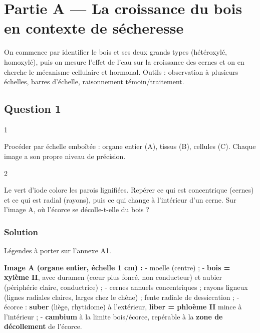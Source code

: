 \documentclass[11pt,a4paper]{article}
\begin{document}
\hypertarget{partie-a-la-croissance-du-bois-en-contexte-de-suxe9cheresse}{%
\section{Partie A --- La croissance du bois en contexte de sécheresse}\label{partie-a-la-croissance-du-bois-en-contexte-de-suxe9cheresse}}

On commence par identifier le bois et ses deux grands types (hétéroxylé, homoxylé), puis on mesure l'effet de l'eau sur la croissance des cernes et on en cherche le mécanisme cellulaire et hormonal. Outils : observation à plusieurs échelles, barres d'échelle, raisonnement témoin/traitement.

\hypertarget{question-1}{%
\subsection{Question 1}\label{question-1}}

\begin{indication}{1}

Procéder par échelle emboîtée : organe entier (A), tissus (B), cellules (C). Chaque image a son propre niveau de précision.

\end{indication}

\begin{indication}{2}

Le vert d'iode colore les parois lignifiées. Repérer ce qui est concentrique (cernes) et ce qui est radial (rayons), puis ce qui change à l'intérieur d'un cerne. Sur l'image A, où l'écorce se décolle-t-elle du bois ?

\end{indication}

\hypertarget{solution}{%
\subsubsection{Solution}\label{solution}}

Légendes à porter sur l'annexe A1.

\textbf{Image A (organe entier, échelle 1 cm) :}
- moelle (centre) ;
- \textbf{bois = xylème II}, avec duramen (cœur plus foncé, non conducteur) et aubier (périphérie claire, conductrice) ;
- cernes annuels concentriques ; rayons ligneux (lignes radiales claires, larges chez le chêne) ; fente radiale de dessiccation ;
- écorce : \textbf{suber} (liège, rhytidome) à l'extérieur, \textbf{liber = phloème II} mince à l'intérieur ;
- \textbf{cambium} à la limite bois/écorce, repérable à la \textbf{zone de décollement} de l'écorce.
\end{document}
